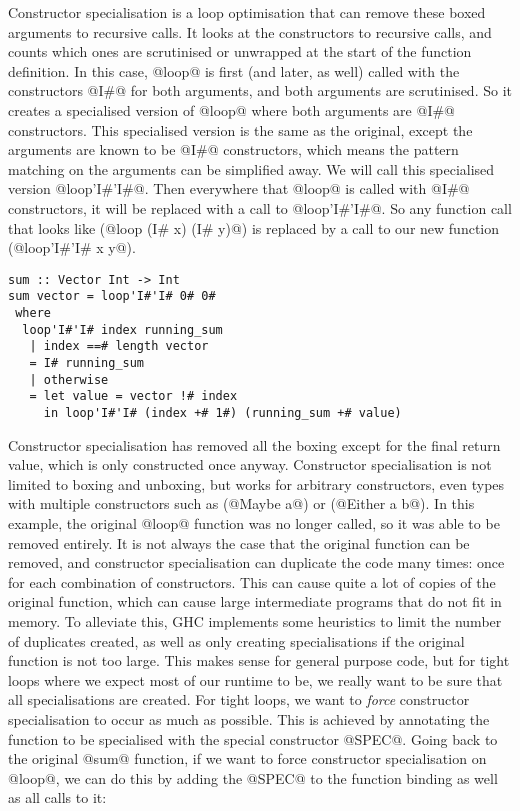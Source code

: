 Constructor specialisation \cite{peyton2007call} is a loop optimisation that can remove these boxed arguments to recursive calls.
It looks at the constructors to recursive calls, and counts which ones are scrutinised or unwrapped at the start of the function definition.
In this case, @loop@ is first (and later, as well) called with the constructors @I#@ for both arguments, and both arguments are scrutinised.
So it creates a specialised version of @loop@ where both arguments are @I#@ constructors.
This specialised version is the same as the original, except the arguments are known to be @I#@ constructors, which means the pattern matching on the arguments can be simplified away.
We will call this specialised version @loop'I#'I#@.
Then everywhere that @loop@ is called with @I#@ constructors, it will be replaced with a call to @loop'I#'I#@.
So any function call that looks like (@loop (I# x) (I# y)@) is replaced by a call to our new function (@loop'I#'I# x y@).

\begin{lstlisting}
sum :: Vector Int -> Int
sum vector = loop'I#'I# 0# 0#
 where
  loop'I#'I# index running_sum
   | index ==# length vector
   = I# running_sum
   | otherwise
   = let value = vector !# index
     in loop'I#'I# (index +# 1#) (running_sum +# value)
\end{lstlisting}

Constructor specialisation has removed all the boxing except for the final return value, which is only constructed once anyway.
Constructor specialisation is not limited to boxing and unboxing, but works for arbitrary constructors, even types with multiple constructors such as (@Maybe a@) or (@Either a b@).
In this example, the original @loop@ function was no longer called, so it was able to be removed entirely.
It is not always the case that the original function can be removed, and constructor specialisation can duplicate the code many times: once for each combination of constructors.
This can cause quite a lot of copies of the original function, which can cause large intermediate programs that do not fit in memory.
To alleviate this, GHC implements some heuristics to limit the number of duplicates created, as well as only creating specialisations if the original function is not too large.
This makes sense for general purpose code, but for tight loops where we expect most of our runtime to be, we really want to be sure that all specialisations are created.
For tight loops, we want to \emph{force} constructor specialisation to occur as much as possible.
This is achieved by annotating the function to be specialised with the special constructor @SPEC@.
Going back to the original @sum@ function, if we want to force constructor specialisation on @loop@, we can do this by adding the @SPEC@ to the function binding as well as all calls to it:

